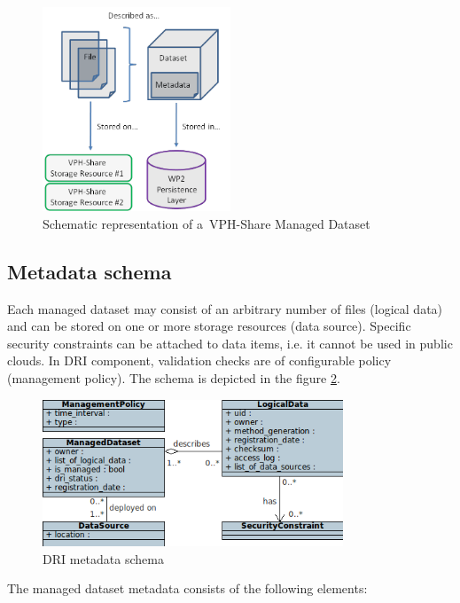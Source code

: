 \begin{figure}[h!]
	\centering
	\includegraphics[width=0.5\textwidth]{images/managed-dataset.png}
	\caption{Schematic representation of a~VPH-Share Managed Dataset}
	\label{fig:managed-dataset}
\end{figure}

\subsection{Metadata schema}
Each managed dataset may consist of an arbitrary number of files (logical 
data) and can be stored on one or more storage resources (data source).
Specific security constraints can be attached to data items, i.e. it cannot be
used in public clouds. In DRI component, validation checks are of configurable
policy (management policy). The schema is depicted in the figure 
\ref{fig:data-model}.\\

\begin{figure}[h!]
	\centering
	\includegraphics[width=0.8\textwidth]{images/data-model.png}
	\caption{DRI metadata schema}
	\label{fig:data-model}
\end{figure}

The managed dataset metadata consists of the following elements:

